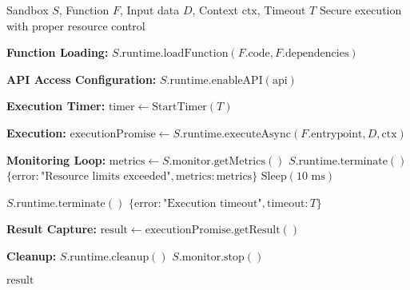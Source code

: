 \begin{protocol}
\label{prot:sandbox-execution}
\begin{algorithmic}[1]
\Require Sandbox $S$, Function $F$, Input data $D$, Context $\text{ctx}$, Timeout $T$
\Ensure Secure execution with proper resource control

\State \textbf{Function Loading:}
\State $S.\text{runtime}.\text{loadFunction}(F.\text{code}, F.\text{dependencies})$

\State \textbf{API Access Configuration:}
        \State $S.\text{runtime}.\text{enableAPI}(\text{api})$
    \EndIf
\EndFor

\State \textbf{Execution Timer:}
\State $\text{timer} \gets \text{StartTimer}(T)$

\State \textbf{Execution:}
\State $\text{executionPromise} \gets S.\text{runtime}.\text{executeAsync}(F.\text{entrypoint}, D, \text{ctx})$

\State \textbf{Monitoring Loop:}
    \State $\text{metrics} \gets S.\text{monitor}.\text{getMetrics}()$
        \State $S.\text{runtime}.\text{terminate}()$
        \State \Return $\{\text{error}: \text{"Resource limits exceeded"}, \text{metrics}: \text{metrics}\}$
    \EndIf
    \State $\text{Sleep}(10\text{ ms})$
\EndWhile

    \State $S.\text{runtime}.\text{terminate}()$
    \State \Return $\{\text{error}: \text{"Execution timeout"}, \text{timeout}: T\}$
\EndIf

\State \textbf{Result Capture:}
\State $\text{result} \gets \text{executionPromise}.\text{getResult}()$

\State \textbf{Cleanup:}
\State $S.\text{runtime}.\text{cleanup}()$
\State $S.\text{monitor}.\text{stop}()$

\State \Return $\text{result}$
\end{algorithmic}
\end{protocol}
